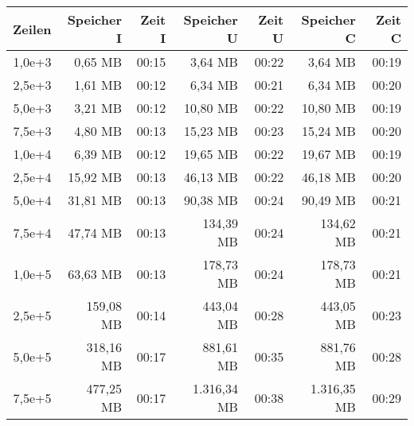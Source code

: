 \begin{table}
    \centering
    \begin{tabular}{|r|r|r|r|r|r|r|}
        \hline
        \textbf{Zeilen} & \textbf{Speicher I} & \textbf{Zeit I} & \textbf{Speicher U} & \textbf{Zeit U} & \textbf{Speicher C} & \textbf{Zeit C} \\ \hline
        1,0e+3          & 0,65 MB             & 00:15           & 3,64 MB             & 00:22           & 3,64 MB             & 00:19           \\ \hline
        2,5e+3          & 1,61 MB             & 00:12           & 6,34 MB             & 00:21           & 6,34 MB             & 00:20           \\ \hline
        5,0e+3          & 3,21 MB             & 00:12           & 10,80 MB            & 00:22           & 10,80 MB            & 00:19           \\ \hline
        7,5e+3          & 4,80 MB             & 00:13           & 15,23 MB            & 00:23           & 15,24 MB            & 00:20           \\ \hline
        1,0e+4          & 6,39 MB             & 00:12           & 19,65 MB            & 00:22           & 19,67 MB            & 00:19           \\ \hline
        2,5e+4          & 15,92 MB            & 00:13           & 46,13 MB            & 00:22           & 46,18 MB            & 00:20           \\ \hline
        5,0e+4          & 31,81 MB            & 00:13           & 90,38 MB            & 00:24           & 90,49 MB            & 00:21           \\ \hline
        7,5e+4          & 47,74 MB            & 00:13           & 134,39 MB           & 00:24           & 134,62 MB           & 00:21           \\ \hline
        1,0e+5          & 63,63 MB            & 00:13           & 178,73 MB           & 00:24           & 178,73 MB           & 00:21           \\ \hline
        2,5e+5          & 159,08 MB           & 00:14           & 443,04 MB           & 00:28           & 443,05 MB           & 00:23           \\ \hline
        5,0e+5          & 318,16 MB           & 00:17           & 881,61 MB           & 00:35           & 881,76 MB           & 00:28           \\ \hline
        7,5e+5          & 477,25 MB           & 00:17           & 1.316,34 MB         & 00:38           & 1.316,35 MB         & 00:29           \\ \hline

\end{tabular}
\end{table}
